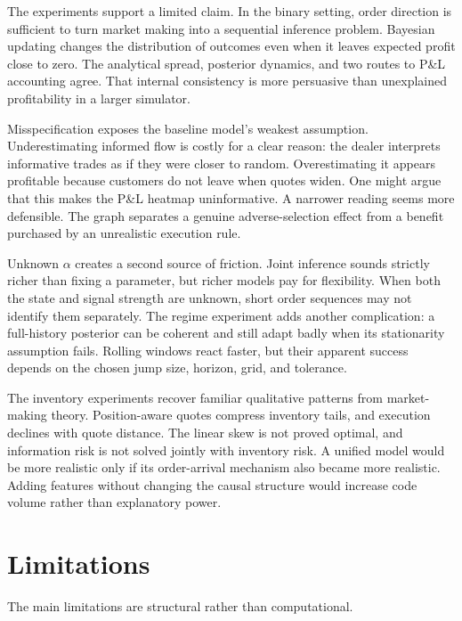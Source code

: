 \documentclass[11pt]{article}
\begin{document}
The experiments support a limited claim. In the binary setting, order direction is sufficient to turn market making into a sequential inference problem. Bayesian updating changes the distribution of outcomes even when it leaves expected profit close to zero. The analytical spread, posterior dynamics, and two routes to P\&L accounting agree. That internal consistency is more persuasive than unexplained profitability in a larger simulator.

Misspecification exposes the baseline model's weakest assumption. Underestimating informed flow is costly for a clear reason: the dealer interprets informative trades as if they were closer to random. Overestimating it appears profitable because customers do not leave when quotes widen. One might argue that this makes the P\&L heatmap uninformative. A narrower reading seems more defensible. The graph separates a genuine adverse-selection effect from a benefit purchased by an unrealistic execution rule.

Unknown $\alpha$ creates a second source of friction. Joint inference sounds strictly richer than fixing a parameter, but richer models pay for flexibility. When both the state and signal strength are unknown, short order sequences may not identify them separately. The regime experiment adds another complication: a full-history posterior can be coherent and still adapt badly when its stationarity assumption fails. Rolling windows react faster, but their apparent success depends on the chosen jump size, horizon, grid, and tolerance.

The inventory experiments recover familiar qualitative patterns from market-making theory. Position-aware quotes compress inventory tails, and execution declines with quote distance. The linear skew is not proved optimal, and information risk is not solved jointly with inventory risk. A unified model would be more realistic only if its order-arrival mechanism also became more realistic. Adding features without changing the causal structure would increase code volume rather than explanatory power.

\section{Limitations}

The main limitations are structural rather than computational.
\end{document}
